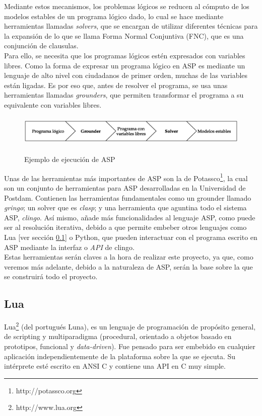Mediante estos mecanismos, los problemas lógicos se reducen al cómputo de los modelos estables de un programa lógico dado, lo cual se hace mediante herramientas llamadas \textit{solvers}, que se encargan de utilizar diferentes técnicas para la expansión de lo que se llama Forma Normal Conjuntiva (FNC), que es una conjunción de clausulas. \\

Para ello, se necesita que los programas lógicos estén expresados con variables libres. Como la forma de expresar un programa lógico en ASP es mediante un lenguaje de alto nivel con ciudadanos de primer orden, muchas de las variables están ligadas. Es por eso que, antes de resolver el programa, se usa unas herramientas llamadas \textit{grounders}, que permiten transformar el programa a su equivalente con variables libres.

\begin{figure}[h]
	\centering
	\includegraphics[height=4em]{images/ASP}
	\label{fig:asp}
	\caption{Ejemplo de ejecución de ASP}
\end{figure}

Unas de las herramientas más importantes de ASP son la de Potassco\footnote{http://potassco.org}, la cual son un conjunto de herramientas para ASP desarrolladas en la Universidad de Postdam. Contienen las herramientas fundamentales como un grounder llamado \textit{gringo}; un solver que es \textit{clasp}; y una herramienta que aguntina todo el sistema ASP, \textit{clingo}. Así mismo, añade más funcionalidades al lenguaje ASP, como puede ser al resolución iterativa, debido a que permite embeber otros lenguajes como Lua [ver sección \ref{subsec:lua}] o Python, que pueden interactuar con el programa escrito en ASP mediante la interfaz o \textit{API} de clingo. \\

Estas herramientas serán claves a la hora de realizar este proyecto, ya que, como veremos más adelante, debido a la naturaleza de ASP, serán la base sobre la que se construirá todo el proyecto.

\subsection{Lua}\label{subsec:lua}

Lua\footnote{http://www.lua.org} \cite{Ierusalimschy:2016:PLF:3002843} (del portugués Luna), es un lenguaje de programación de propósito general, de scripting y multiparadigma (procedural, orientado a objetos basado en prototipos, funcional y \textit{data-driven}). Fue pensado para ser embebido en cualquier aplicación independientemente de la plataforma sobre la que se ejecuta. Su intérprete esté escrito en ANSI C y contiene una API en C muy simple. \\

